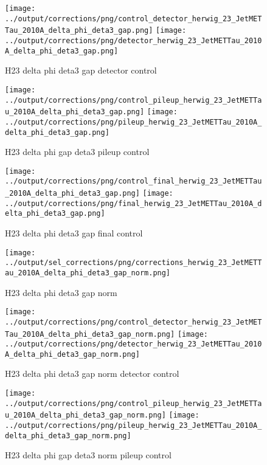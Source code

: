 \documentclass[11pt]{book}
\begin{document}
\begin{figure}[ht]
\centering
\texttt{[image: ../output/corrections/png/control\_detector\_herwig\_23\_JetMETTau\_2010A\_delta\_phi\_deta3\_gap.png]}
\texttt{[image: ../output/corrections/png/detector\_herwig\_23\_JetMETTau\_2010A\_delta\_phi\_deta3\_gap.png]}
\caption{H23 delta phi deta3 gap detector control}
\label{fig:H23_JetMETTau_2010A_delta_phi_deta3_gap_detector_control}
\end{figure}

\begin{figure}[ht]
\centering
\texttt{[image: ../output/corrections/png/control\_pileup\_herwig\_23\_JetMETTau\_2010A\_delta\_phi\_deta3\_gap.png]}
\texttt{[image: ../output/corrections/png/pileup\_herwig\_23\_JetMETTau\_2010A\_delta\_phi\_deta3\_gap.png]}
\caption{H23 delta phi gap deta3 pileup control}
\label{fig:H23_JetMETTau_2010A_delta_phi_deta3_gap_pileup_control}
\end{figure}


\begin{figure}[ht]
\centering
\texttt{[image: ../output/corrections/png/control\_final\_herwig\_23\_JetMETTau\_2010A\_delta\_phi\_deta3\_gap.png]}
\texttt{[image: ../output/corrections/png/final\_herwig\_23\_JetMETTau\_2010A\_delta\_phi\_deta3\_gap.png]}
\caption{H23 delta phi deta3 gap final control}
\label{fig:H23_JetMETTau_2010A_delta_phi_deta3_gap_final_control}
\end{figure}


\begin{figure}[ht]
\centering
\texttt{[image: ../output/sel\_corrections/png/corrections\_herwig\_23\_JetMETTau\_2010A\_delta\_phi\_deta3\_gap\_norm.png]}
\caption{H23 delta phi deta3 gap norm}
\label{fig:H23_JetMETTau_2010A_delta_phi_deta3_gap_norm}
\end{figure}


\begin{figure}[ht]
\centering
\texttt{[image: ../output/corrections/png/control\_detector\_herwig\_23\_JetMETTau\_2010A\_delta\_phi\_deta3\_gap\_norm.png]}
\texttt{[image: ../output/corrections/png/detector\_herwig\_23\_JetMETTau\_2010A\_delta\_phi\_deta3\_gap\_norm.png]}
\caption{H23 delta phi deta3 gap norm detector control}
\label{fig:H23_JetMETTau_2010A_delta_phi_deta3_gap_norm_detector_control}
\end{figure}

\begin{figure}[ht]
\centering
\texttt{[image: ../output/corrections/png/control\_pileup\_herwig\_23\_JetMETTau\_2010A\_delta\_phi\_deta3\_gap\_norm.png]}
\texttt{[image: ../output/corrections/png/pileup\_herwig\_23\_JetMETTau\_2010A\_delta\_phi\_deta3\_gap\_norm.png]}
\caption{H23 delta phi gap deta3 norm pileup control}
\label{fig:H23_JetMETTau_2010A_delta_phi_deta3_gap_norm_pileup_control}
\end{figure}
\end{document}

